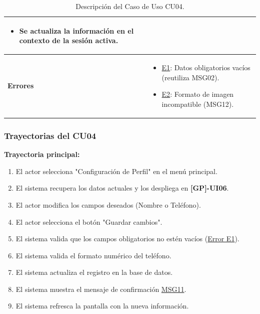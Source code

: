 \begin{appendices}
\begin{table}[htbp]
\begin{tabular}{|p{3.5cm}|p{10.5cm}|}
\begin{itemize}[nosep, leftmargin=*]
    \item Se actualiza la información en el contexto de la sesión activa.
\end{itemize} \\ \hline
\textbf{Errores} & 
\begin{itemize}[nosep, leftmargin=*]
    \item \hyperlink{msg:MSG02}{E1}: Datos obligatorios vacíos (reutiliza MSG02).
    \item \hyperlink{err:E7}{E2}: Formato de imagen incompatible (MSG12).
\end{itemize} \\ \hline
\end{tabular}
\caption{Descripción del Caso de Uso CU04.}
\label{tab:cu04_especificacion}
\end{table}

\subsubsection{Trayectorias del CU04}
\textbf{Trayectoria principal:}
\begin{enumerate}[nosep]
    \item El actor selecciona "Configuración de Perfil" en el menú principal.
    \item El sistema recupera los datos actuales y los despliega en \textbf{[GP]-UI06}.
    \item El actor modifica los campos deseados (Nombre o Teléfono).
    \item El actor selecciona el botón "Guardar cambios".
    \item El sistema valida que los campos obligatorios no estén vacíos (\hyperlink{msg:MSG02}{Error E1}).
    \item El sistema valida el formato numérico del teléfono.
    \item El sistema actualiza el registro en la base de datos.
    \item El sistema muestra el mensaje de confirmación \hyperlink{msg:MSG11}{MSG11}.
    \item El sistema refresca la pantalla con la nueva información.
\end{enumerate}


\end{appendices}

